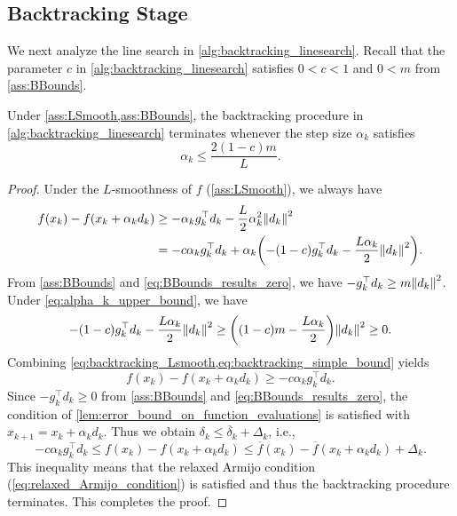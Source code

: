 \documentclass[journal]{subfiles}
\begin{document}
\subsection{Backtracking Stage}\label{sec:inner_loop}

We next analyze the line search in \cref{alg:backtracking_linesearch}.
Recall that the parameter $c$ in \cref{alg:backtracking_linesearch} satisfies $0 < c < 1$ and $0 < m$ from \cref{ass:BBounds}.

\begin{lemma}\label{lem:backtracking_finite}
    Under \cref{ass:LSmooth,ass:BBounds},
    the backtracking procedure in \cref{alg:backtracking_linesearch} terminates whenever the step size $\alpha_k$ satisfies
    \begin{equation}\label{eq:alpha_k_upper_bound}
        \alpha_k \le \frac{2(1-c)m}{L}.
    \end{equation}
\end{lemma}
\begin{proof}
    Under the $L$-smoothness of $f$ (\cref{ass:LSmooth}), we always have
    \begin{align}
        f(x_k)-f(x_k+\alpha_k d_k)
         & \ge -\alpha_k g_k^\top d_k - \frac{L}{2}\alpha_k^2\norm{d_k}^2                                   \notag                           \\
         & = -c \alpha_k g_k^\top d_k + \alpha_k \qty(-(1-c)g_k^\top d_k - \frac{L\alpha_k}{2}\norm{d_k}^2). \label{eq:backtracking_Lsmooth}
    \end{align}
    From \cref{ass:BBounds} and \cref{eq:BBounds_results_zero}, we have $-g_k^\top d_k \geq m \norm{d_k}^2$.
    Under \cref{eq:alpha_k_upper_bound}, we have
    \begin{equation}\label{eq:backtracking_simple_bound}
        -(1-c)g_k^\top d_k - \frac{L\alpha_k}{2}\norm{d_k}^2
        \ge \qty((1-c)m - \frac{L\alpha_k}{2})\norm{d_k}^2 \ge 0.
    \end{equation}
    Combining \cref{eq:backtracking_Lsmooth,eq:backtracking_simple_bound} yields
    \begin{equation*}
        f(x_k) - f(x_k+\alpha_k d_k) \geq -c \alpha_k g_k^\top d_k.
    \end{equation*}
    Since $-g_k^\top d_k \geq 0$ from \cref{ass:BBounds} and \cref{eq:BBounds_results_zero}, the condition of \cref{lem:error_bound_on_function_evaluations} is satisfied with $x_{k+1} = x_k + \alpha_k d_k$. Thus we obtain $\delta_k \le \overline{\delta}_k + \Delta_k$, i.e.,
    \begin{equation*}
        -c\alpha_k g_k^\top d_k
        \le
        f(x_k) - f(x_k+\alpha_k d_k)
        \le \overline{f}(x_k) - \overline{f}(x_k+\alpha_k d_k) + \Delta_k.
    \end{equation*}
    This inequality means that the relaxed Armijo condition (\cref{eq:relaxed_Armijo_condition}) is satisfied and thus the backtracking procedure terminates.
    This completes the proof.
    \myQED
\end{proof}
\end{document}
